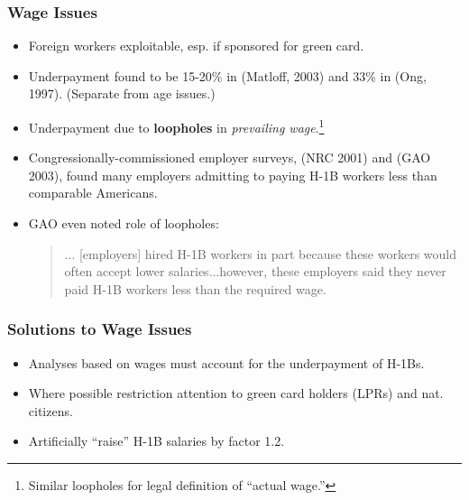 \documentclass{beamer}
\begin{document}
\begin{frame}
\frametitle{Wage Issues}
\pause

\begin{itemize}

\item Foreign workers exploitable, esp. if sponsored for green card. 
\pause

\item Underpayment found to be 15-20\% in (Matloff, 2003) and 33\% in
(Ong, 1997).  (Separate from age issues.)
\pause

\item Underpayment due to {\bf loopholes} in {\it prevailing
wage}.\footnote{Similar loopholes for legal definition of ``actual
wage.''}
\pause

\item Congressionally-commissioned employer surveys, (NRC 2001) and
(GAO 2003), found many employers admitting to paying H-1B workers less
than comparable Americans.
\pause

\item GAO even noted role of loopholes:  

\begin{quote}
... [employers] hired H-1B workers in part because these workers 
would often accept lower salaries...however, these employers said 
they never paid H-1B workers less than the required wage. 
\end{quote}

\end{itemize}

\end{frame}

\begin{frame}
\frametitle{Solutions to Wage Issues}
\pause

\begin{itemize}

\item Analyses based on wages must account for the underpayment of
H-1Bs. 
\pause

\item Where possible restriction attention to green card holders (LPRs) and
nat. citizens.
\pause

\item Artificially ``raise'' H-1B salaries by factor 1.2.

\end{itemize}

\end{frame}
\end{document}
